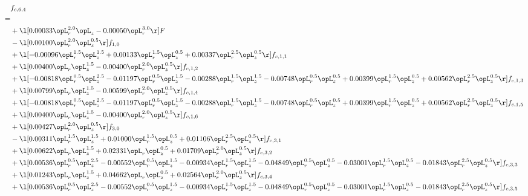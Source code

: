 \begin{alignat}{2} 
\label{eq:f_64_1} 
& f_{c,6,4} \nonumber \\ 
 = \\ 
& + \l[  0.00033 \opL_r^{2.0} \opL_z   -0.00050 \opL_r^{3.0}  \r] F \nonumber \\ 
& - \l[  0.00100 \opL_r^{2.0} \opL_z^{0.5}  \r] f_{1,0} \nonumber \\ 
& + \l[  -0.00096 \opL_r^{1.5} \opL_z^{1.5} +  0.00133 \opL_r^{1.5} \opL_z^{0.5} +  0.00337 \opL_r^{2.5} \opL_z^{0.5}  \r] f_{c,1,1} \nonumber \\ 
& + \l[  0.00400 \opL_r \opL_z^{1.5}   -0.00400 \opL_r^{2.0} \opL_z^{0.5}  \r] f_{c,1,2} \nonumber \\ 
& + \l[  -0.00818 \opL_r^{0.5} \opL_z^{2.5}   -0.01197 \opL_r^{0.5} \opL_z^{1.5}   -0.00288 \opL_r^{1.5} \opL_z^{1.5}   -0.00748 \opL_r^{0.5} \opL_z^{0.5} +  0.00399 \opL_r^{1.5} \opL_z^{0.5} +  0.00562 \opL_r^{2.5} \opL_z^{0.5}  \r] f_{c,1,3} \nonumber \\ 
& + \l[  0.00799 \opL_r \opL_z^{1.5}   -0.00599 \opL_r^{2.0} \opL_z^{0.5}  \r] f_{c,1,4} \nonumber \\ 
& + \l[  -0.00818 \opL_r^{0.5} \opL_z^{2.5}   -0.01197 \opL_r^{0.5} \opL_z^{1.5}   -0.00288 \opL_r^{1.5} \opL_z^{1.5}   -0.00748 \opL_r^{0.5} \opL_z^{0.5} +  0.00399 \opL_r^{1.5} \opL_z^{0.5} +  0.00562 \opL_r^{2.5} \opL_z^{0.5}  \r] f_{c,1,5} \nonumber \\ 
& + \l[  0.00400 \opL_r \opL_z^{1.5}   -0.00400 \opL_r^{2.0} \opL_z^{0.5}  \r] f_{c,1,6} \nonumber \\ 
& + \l[  0.00427 \opL_r^{2.0} \opL_z^{0.5}  \r] f_{3,0} \nonumber \\ 
& - \l[  0.00311 \opL_r^{1.5} \opL_z^{1.5} +  0.01000 \opL_r^{1.5} \opL_z^{0.5} +  0.01106 \opL_r^{2.5} \opL_z^{0.5}  \r] f_{c,3,1} \nonumber \\ 
& + \l[  0.00622 \opL_r \opL_z^{1.5} +  0.02331 \opL_r \opL_z^{0.5} +  0.01709 \opL_r^{2.0} \opL_z^{0.5}  \r] f_{c,3,2} \nonumber \\ 
& + \l[  0.00536 \opL_r^{0.5} \opL_z^{2.5}   -0.00552 \opL_r^{0.5} \opL_z^{1.5}   -0.00934 \opL_r^{1.5} \opL_z^{1.5}   -0.04849 \opL_r^{0.5} \opL_z^{0.5}   -0.03001 \opL_r^{1.5} \opL_z^{0.5}   -0.01843 \opL_r^{2.5} \opL_z^{0.5}  \r] f_{c,3,3} \nonumber \\ 
& + \l[  0.01243 \opL_r \opL_z^{1.5} +  0.04662 \opL_r \opL_z^{0.5} +  0.02564 \opL_r^{2.0} \opL_z^{0.5}  \r] f_{c,3,4} \nonumber \\ 
& + \l[  0.00536 \opL_r^{0.5} \opL_z^{2.5}   -0.00552 \opL_r^{0.5} \opL_z^{1.5}   -0.00934 \opL_r^{1.5} \opL_z^{1.5}   -0.04849 \opL_r^{0.5} \opL_z^{0.5}   -0.03001 \opL_r^{1.5} \opL_z^{0.5}   -0.01843 \opL_r^{2.5} \opL_z^{0.5}  \r] f_{c,3,5} \nonumber \\ 

\end{alignat}

